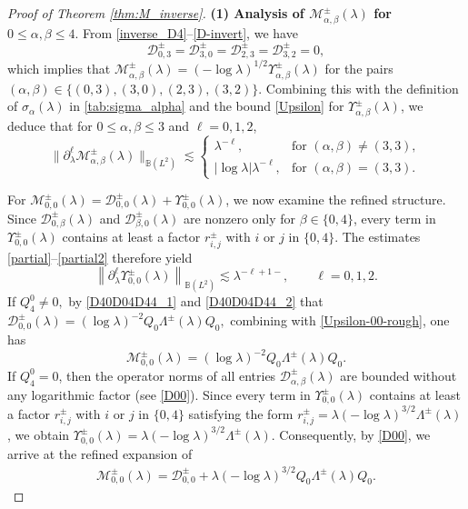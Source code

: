 \documentclass[reqno]{amsart}
\numberwithin{equation}{section}
\begin{document}
\begin{proof}[Proof of Theorem \ref{thm:M_inverse}]
	\vspace{1.5mm}  
	\textbf{(1) Analysis of $\mathcal{M}_{\alpha,\beta}^{\pm}(\lambda)$ for $0 \leq \alpha, \beta \leq 4.$}
From \eqref{inverse_D4}--\eqref{D-invert}, we have
\[
\mathcal{D}_{0,3}^{\pm} = \mathcal{D}_{3,0}^{\pm} = \mathcal{D}_{2,3}^{\pm} = \mathcal{D}_{3,2}^{\pm} = 0,
\]
which implies that $\mathcal{M}_{\alpha,\beta}^{\pm}(\lambda) = (-\log \lambda)^{1/2} \Upsilon_{\alpha,\beta}^\pm(\lambda)$ for the pairs $(\alpha,\beta) \in \{(0,3), (3,0), (2,3), (3,2)\}$.
Combining this with the definition of $\sigma_\alpha(\lambda)$ in \eqref{tab:sigma_alpha} and the bound \eqref{Upsilon} for $\Upsilon_{\alpha,\beta}^\pm(\lambda)$, we deduce that for $0 \le \alpha, \beta \le 3$ and $\ell = 0,1,2$,
\[
\Big\| \partial_\lambda^\ell \mathcal{M}_{\alpha,\beta}^\pm(\lambda) \Big\|_{\mathbb{B}(L^2)} \lesssim
\begin{cases}
	\lambda^{-\ell}, & \text{for } (\alpha, \beta) \neq (3,3), \\
	|\log \lambda| \lambda^{-\ell}, &  \text{for } (\alpha, \beta) = (3,3).
	\end{cases}\]

For $\mathcal{M}_{0,0}^{\pm}(\lambda)=\mathcal{D}_{0,0}^\pm(\lambda) + \Upsilon_{0,0}^\pm(\lambda)$, we now examine the refined structure.
Since $\mathcal{D}_{0,\beta}^\pm(\lambda)$ and $\mathcal{D}_{\beta,0}^\pm(\lambda)$ are nonzero only for $\beta \in \{0,4\}$, every term in $\Upsilon_{0,0}^\pm(\lambda)$ contains at least a factor $r_{i,j}^\pm$ with $i$ or $j$ in $\{0,4\}$. The estimates \eqref{partial}--\eqref{partial2} therefore yield
\begin{equation}\label{Upsilon-00-rough}
	\left\|
	\partial_\lambda^\ell
	\Upsilon_{0,0}^\pm(\lambda)
	\right\|_{\mathbb B(L^2)}
	\lesssim
	\lambda^{-\ell+1-},
	\qquad
	\ell=0,1,2.
\end{equation}
If $Q_4^0\neq0,$ by \eqref{D40D04D44_1} and \eqref{D40D04D44_2} that  $\mathcal{D}_{0,0}^{\pm}(\lambda) = (\log \lambda)^{-2} Q_0 \Lambda^\pm(\lambda) Q_0,$ combining with \eqref{Upsilon-00-rough}, one has $$\mathcal{M}_{0,0}^{\pm}(\lambda) = (\log \lambda)^{-2} Q_0 \Lambda^\pm(\lambda) Q_0.$$
If  $Q_4^0 = 0$, then the operator norms of all entries $\mathcal{D}_{\alpha,\beta}^{\pm}(\lambda)$ are bounded without any logarithmic factor (see \eqref{D00}). Since every term in $\Upsilon_{0,0}^\pm(\lambda)$ contains at least a factor $r_{i,j}^\pm$ with $i$ or $j$ in $\{0,4\}$ satisfying the form $r_{i,j}^\pm=\lambda(-\log\lambda)^{3/2}\Lambda^\pm(\lambda)$,  we obtain $\Upsilon_{0,0}^\pm(\lambda) = \lambda (-\log \lambda)^{3/2} \Lambda^\pm(\lambda)$. Consequently, by \eqref{D00}, we arrive at the refined expansion of \begin{align*}
\mathcal M_{0,0}^\pm(\lambda)
=
\mathcal D_{0,0}^\pm
+
\lambda(-\log\lambda)^{3/2}
Q_0\Lambda^\pm(\lambda)Q_0.\end{align*}


\end{proof}
\end{document}
